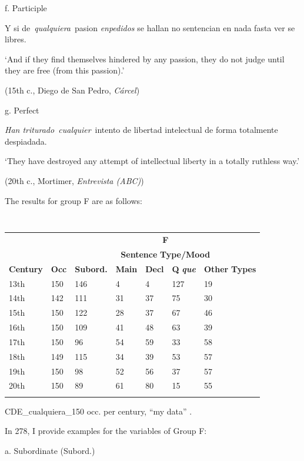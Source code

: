   f.  Participle

    Y si de~\textit{qualquiera}~pasion \textit{enpedidos} se hallan no sentencian en nada fasta ver se libres. 

    ‘And if they find themselves hindered by any passion, they do not judge until they are free (from this passion).’

    (15th c., Diego de San Pedro, \textit{Cárcel})

  g.  Perfect

    \textit{Han triturado~cualquier}~intento de libertad intelectual de forma totalmente despiadada. 

    ‘They have destroyed any attempt of intellectual liberty in a totally ruthless way.’

    (20th c., Mortimer, \textit{Entrevista (ABC)})

The results for group F are as follows:

\begin{table}
\begin{tabularx}{\textwidth}{XXXXXXX}
\lsptoprule
\multicolumn{1}{c}{} &  & \multicolumn{5}{c}{ \textbf{F}}\\
\multicolumn{1}{c}{} &  & \multicolumn{5}{c}{ \textbf{Sentence} \textbf{Type/Mood}}\\
 \textbf{Century} & \textbf{Occ} & \textbf{Subord.} & \textbf{Main} & \textbf{Decl} & \textbf{Q} \textbf{\textit{que}} & \textbf{Other} \textbf{Types}\\
 13th & 150 & 146 & 4 & 4 & 127 & 19\\
 14th & 142 & 111 & 31 & 37 & 75 & 30\\
 15th & 150 & 122 & 28 & 37 & 67 & 46\\
 16th & 150 & 109 & 41 & 48 & 63 & 39\\
 17th & 150 & 96 & 54 & 59 & 33 & 58\\
 18th & 149 & 115 & 34 & 39 & 53 & 57\\
 19th & 150 & 98 & 52 & 56 & 37 & 57\\
 20th & 150 & 89 & 61 & 80 & 15 & 55\\
\lspbottomrule
\end{tabularx}
\caption{\label{tab:} ~}CDE\_cualquiera\_150 occ. per century, “my data” .
\end{table}

In 278, I provide examples for the variables of Group F:

  a.  Subordinate (Subord.)

